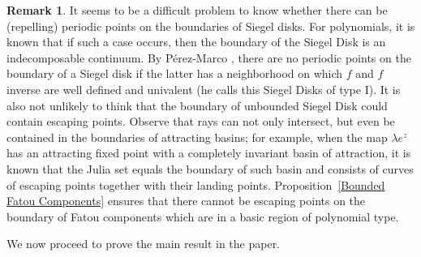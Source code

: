 \documentclass[11pt, twoside]{article}
\theoremstyle{definition}
\newtheorem{rem}[thm]{Remark}
\begin{document}
{\begin{rem} It seems to be a difficult problem to know whether there can be (repelling) periodic points on the boundaries of Siegel disks. For polynomials, it is known that if such a case occurs, then the boundary of the Siegel Disk is an indecomposable continuum. By P\'erez-Marco \cite{PM}, there are no periodic points on the boundary of a Siegel disk if the latter has a neighborhood  on which $f$ and $f$ inverse are well defined and univalent (he calls this Siegel Disks of type I).  It is also not unlikely to think that the boundary of unbounded Siegel Disk could contain escaping points.   Observe that rays can not only intersect, but even be contained in the boundaries of attracting basins; for example, when the map $\lambda e^z$ has an attracting fixed point with  a completely invariant basin of attraction, it is known that the Julia set equals the boundary of such basin and consists of curves of escaping points together with their landing points. Proposition~\ref{Bounded Fatou Components} ensures that there cannot be escaping points on the boundary of  Fatou components which are in a basic region of polynomial type.
\end{rem}} 

We now proceed to prove the main result in the paper. 
\end{document}
